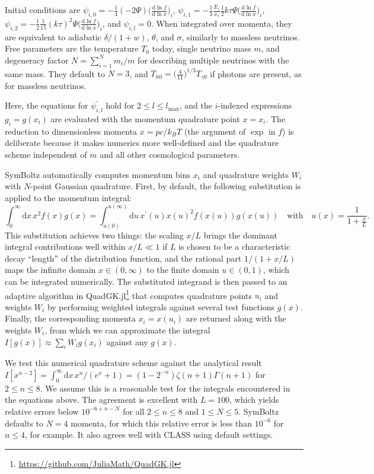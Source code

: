 \documentclass{aa}
\newcommand\lmax{l_\text{max}}
\newcommand\dlnfdlnx{\frac{\mathrm{d} \ln f}{\mathrm{d} \ln x}}
\begin{document}
Initial conditions are $\psi_{i,0} = -\frac{1}{4} (-2 \Psi) \big(\dlnfdlnx\big)_i$, $\psi_{i,1} = -\frac{1}{3} \frac{E_i}{x_i} \frac{1}{2} k\tau \Psi \big(\dlnfdlnx\big)_i$, $\psi_{i,2} = -\frac{1}{2} \frac{1}{15} (k\tau)^2 \Psi \big(\dlnfdlnx\big)_i$, and $\psi_{i,l} = 0$.
When integrated over momenta, they are equivalent to adiabatic $\delta/(1+w)$, $\theta$, and $\sigma$, similarly to massless neutrinos.
Free parameters are the temperature $T_0$ today, single neutrino mass $m$, and degeneracy factor $N = \sum_{i=1}^N m_i / m$ for describing multiple neutrinos with the same mass.
They default to $N = 3$, and $T_{h0} = \big(\frac{4}{11}\big)^{1/3} T_{\gamma 0}$ if photons are present, as for massless neutrinos.

Here, the equations for $\psi_{i,l}^\prime$ hold for $2 \leq l \leq \lmax$, and the $i$-indexed expressions $g_i = g(x_i)$ are evaluated with the momentum quadrature point $x = x_i$.
The reduction to dimensionless momenta $x = pc/k_B T$ (the argument of $\exp$ in $f$) is deliberate because it makes numerics more well-defined and the quadrature scheme independent of $m$ and all other cosmological parameters.

SymBoltz automatically computes momentum bins $x_i$ and quadrature weights $W_i$ with $N$-point Gaussian quadrature.
First, by default, the following substitution is applied to the momentum integral:
\begin{equation*}
    \int_0^\infty \mathrm{d}x \, x^2 f(x) g(x) = \int_{u(0)}^{u(\infty)} \mathrm{d}u \, x^\prime(u) x(u)^2 f(x(u)) g(x(u))
    \quad \text{with} \quad
    u(x) = \frac{1}{1+\frac{x}{L}} .
\end{equation*}
This substitution achieves two things: the scaling $x/L$ brings the dominant integral contributions well within $x/L \ll 1$ if $L$ is chosen to be a characteristic decay \enquote{length} of the distribution function, and the rational part $1/(1+x/L)$ maps the infinite domain $x \in (0, \infty)$ to the finite domain $u \in (0, 1)$, which can be integrated numerically.
The substituted integrand is then passed to an adaptive algorithm in QuadGK.jl\footnote{\url{https://github.com/JuliaMath/QuadGK.jl}} that computes quadrature points $u_i$ and weights $W_i$ by performing weighted integrals against several test functions $g(x)$.
Finally, the corresponding momenta $x_i = x(u_i)$ are returned along with the weights $W_i$, from which we can approximate the integral $I[g(x)] \approx \sum_i W_i g(x_i)$ against any $g(x)$.

We test this numerical quadrature scheme against the analytical result $I[x^{n-2}] = \int_0^\infty \mathrm{d}x \, x^n / (e^x+1) = (1-2^{-n}) \zeta(n+1) \Gamma(n+1)$ for $2 \leq n \leq 8$.
We assume this is a reasonable test for the integrals encountered in the equations above. 
The agreement is excellent with $L = 100$, which yields relative errors below $10^{-6+n-N}$ for all $2 \leq n \leq 8$ and $1 \leq N \leq 5$.
SymBoltz defaults to $N=4$ momenta, for which this relative error is less than $10^{-6}$ for $n \leq 4$, for example.
It also agrees well with CLASS using default settings.
\end{document}
